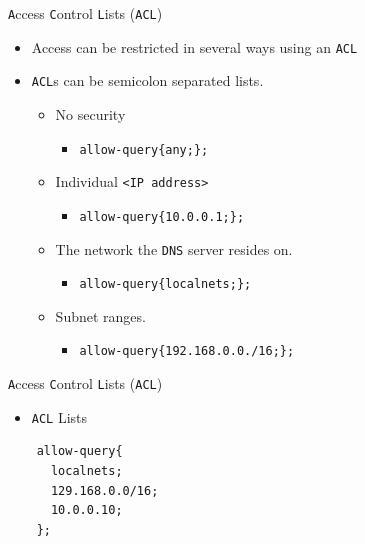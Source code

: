 \documentclass[xcolor=table]{beamer}
\begin{document}
\begin{frame}{\texttt{A}ccess \texttt{C}ontrol \texttt{L}ists (\texttt{ACL})}
  \begin{itemize}
    \item Access can be restricted in several ways using an \texttt{ACL}
    \item \texttt{ACL}s can be semicolon separated lists.
      \begin{itemize}
        \item No security
          \begin{itemize}
            \item \texttt{allow-query\{any;\};}
          \end{itemize}
        \item Individual \texttt{<IP address>}
          \begin{itemize}
            \item \texttt{allow-query\{10.0.0.1;\};}
          \end{itemize}
        \item The network the \texttt{DNS} server resides on.
          \begin{itemize}
            \item \texttt{allow-query\{localnets;\};}
          \end{itemize}
        \item Subnet ranges.
          \begin{itemize}
            \item \texttt{allow-query\{192.168.0.0./16;\};}
          \end{itemize}
        \end{itemize}
  \end{itemize}
\end{frame}

\begin{frame}[fragile]{\texttt{A}ccess \texttt{C}ontrol \texttt{L}ists (\texttt{ACL})}
  \begin{itemize}
    \item \texttt{ACL} Lists
  \end{itemize}
  \lstset{
    basicstyle=\small\ttfamily,
  }
  \begin{lstlisting}
    allow-query{
      localnets;
      129.168.0.0/16;
      10.0.0.10;
    };
  \end{lstlisting}
\end{frame}
\end{document}
